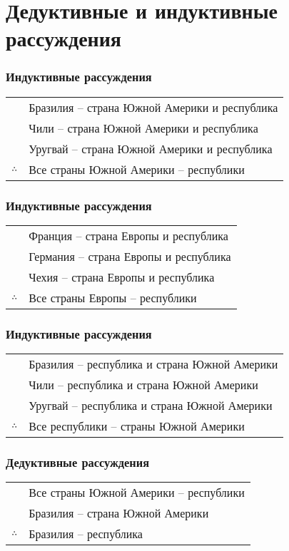 \documentclass[24pt,pdf,hyperref={unicode}]{beamer}
\begin{document}
\section{Дедуктивные и индуктивные рассуждения}

\begin{frame}\frametitle{Индуктивные рассуждения}
\begin{tabular}{l l}
 & Бразилия -- страна Южной Америки и республика \\
 & Чили -- страна Южной Америки и республика \\
 & Уругвай -- страна Южной Америки и республика \\
\hline
$\therefore$ & Все страны Южной Америки -- республики \\
\end{tabular}
\end{frame}

\begin{frame}\frametitle{Индуктивные рассуждения}
\begin{tabular}{l l}
 & Франция -- страна Европы и республика \\
 & Германия -- страна Европы и республика \\
 & Чехия -- страна Европы и республика \\
\hline
$\therefore$ & Все страны Европы -- республики \\
\end{tabular}
\begin{flushright}
\end{flushright}
\end{frame}


\begin{frame}\frametitle{Индуктивные рассуждения}
\begin{tabular}{l l}
 & Бразилия -- республика и страна Южной Америки \\
 & Чили -- республика и страна Южной Америки \\
 & Уругвай -- республика и страна Южной Америки \\
\hline
$\therefore$ & Все республики -- страны Южной Америки\\
\end{tabular}
\begin{flushright}
\end{flushright}
\end{frame}


\begin{frame}\frametitle{Дедуктивные рассуждения}
\begin{tabular}{l l}
 & Все страны Южной Америки -- республики \\
 & Бразилия -- страна Южной Америки\\
 \hline
$\therefore$ & Бразилия -- республика \\
\end{tabular}
\end{frame}
\end{document}
